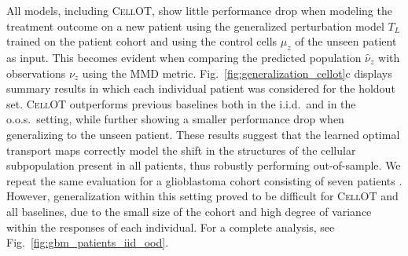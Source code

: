  All models, including \textsc{CellOT}, show little performance drop when modeling the treatment outcome on a new patient using the generalized perturbation model $T_L$ trained on the patient cohort and using the control cells $\mu_z$ of the unseen patient as input.
This becomes evident when comparing the predicted population $\hat{\nu}_z$ with observations $\nu_z$ using the \acrshort{MMD} metric. Fig.~\ref{fig:generalization_cellot}c displays summary results in which each individual patient was considered for the holdout set. \textsc{CellOT} outperforms previous baselines both in the i.i.d.~and in the o.o.s.~setting, while further showing a smaller performance drop when generalizing to the unseen patient.
These results suggest that the learned optimal transport maps correctly model the shift in the structures of the cellular subpopulation present in all patients, thus robustly performing out-of-sample.
We repeat the same evaluation for a glioblastoma cohort consisting of seven patients \citep{zhao2021deconvolution}. However, generalization within this setting proved to be difficult for \textsc{CellOT} and all baselines, due to the small size of the cohort and high degree of variance within the responses of each individual. 
For a complete analysis, see Fig.~\ref{fig:gbm_patients_iid_ood}.

